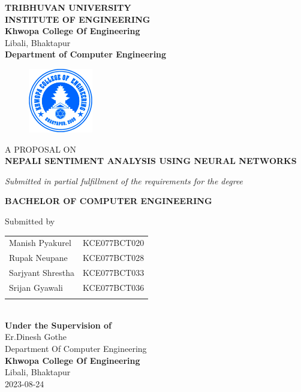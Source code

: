 \begin{center}
	\thispagestyle{empty}
	\Large\textbf{TRIBHUVAN UNIVERSITY}\\
	\Large\textbf{INSTITUTE OF ENGINEERING }\\
	\vspace{0.2in}
	\large{\textbf{Khwopa College Of Engineering}\\}
	\normalsize{Libali, Bhaktapur\\}
	\large\textbf{Department of Computer Engineering}
	\vspace{0.2in}
	\begin{figure}[h]
			\centering
				\includegraphics[width=0.25\textwidth]{img/Khwopalogo.jpg}
	\end{figure}
	
	\vspace{0.2in}
	\large{A PROPOSAL ON\\\textbf{NEPALI SENTIMENT ANALYSIS USING NEURAL NETWORKS}\\}
	
	\vspace{0.2in}
	\large{\textit{Submitted in partial fulfillment of the requirements for the degree\\}}
	
	\vspace{0.2in}
	\large{\textbf{BACHELOR OF COMPUTER ENGINEERING}\\}
	
	\vspace{0.2in}
	\large{Submitted by}\\
	\begin{tabular}{p{3.2in}p{1.2in}}
		\hspace{0.3cm}Manish Pyakurel & KCE077BCT020\\
		\hspace{0.3cm}Rupak Neupane & KCE077BCT028\\
		\hspace{0.3cm}Sarjyant Shrestha & KCE077BCT033\\
		\hspace{0.3cm}Srijan Gyawali & KCE077BCT036\\
	 \vspace{0.2in}
	\end{tabular}
	\\
	\vspace{0.5cm}
	\large{\textbf{Under the Supervision of}\\}
		\normalsize{Er.Dinesh Gothe\\
			Department Of Computer Engineering\\
		}
		\vspace{1cm}
	\large{\textbf{Khwopa College Of Engineering}\\}
		\normalsize{Libali, Bhaktapur\\
		2023-08-24	
	}
\end{center}


  